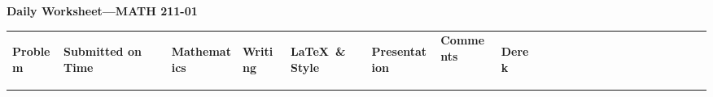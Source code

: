 \documentclass[landscape]{article}
\begin{document}
\thispagestyle{empty}

\begin{center}
    \Large\textbf{Daily Worksheet—MATH 211-01}
\end{center}

\vspace{0.25cm}

\setlength{\tabcolsep}{4pt}
\renewcommand{\arraystretch}{1.5}

\noindent
\begin{tabular}{|
>{\centering\arraybackslash}m{1.5 cm}|
>{\centering\arraybackslash}m{0.35cm}|
>{\centering\arraybackslash}m{0.35cm}|
>{\centering\arraybackslash}m{0.35cm}|
>{\centering\arraybackslash}m{0.35cm}|
>{\centering\arraybackslash}m{0.35cm}|
>{\arraybackslash}m{9.5cm}|
>{\centering\arraybackslash}m{0.35cm}|%
>{\centering\arraybackslash}m{0.35cm}|%
>{\centering\arraybackslash}m{0.35cm}|%
>{\centering\arraybackslash}m{0.35cm}|%
>{\centering\arraybackslash}m{0.35cm}|%
>{\centering\arraybackslash}m{0.35cm}|%
>{\centering\arraybackslash}m{0.35cm}|%
>{\centering\arraybackslash}m{0.35cm}|%
>{\centering\arraybackslash}m{0.35cm}|%
>{\centering\arraybackslash}m{0.35cm}|%
>{\centering\arraybackslash}m{0.35cm}|%
>{\centering\arraybackslash}m{0.35cm}|%
>{\centering\arraybackslash}m{0.35cm}|%
>{\centering\arraybackslash}m{0.35cm}|%
>{\centering\arraybackslash}m{0.35cm}|%
>{\centering\arraybackslash}m{0.35cm}|%
}
\hline
\multicolumn{7}{|c|}{\textbf{Presenters}} & \multicolumn{16}{c|}{\textbf{Contributors}} \\
\hline
\begin{turn}{90}\textbf{Problem}\end{turn} &
\begin{turn}{90}\textbf{Submitted on Time ~}\end{turn} &
\begin{turn}{90}\textbf{Mathematics}\end{turn} &
\begin{turn}{90}\textbf{Writing}\end{turn} &
\begin{turn}{90}\textbf{\LaTeX\ \& Style}\end{turn} &
\begin{turn}{90}\textbf{Presentation}\end{turn} &
\parbox[c][1.5cm][c]{8cm}{\centering\textbf{Comments}} &
\begin{turn}{90}\textbf{Derek}\end{turn} &

\end{tabular}
\end{document}
